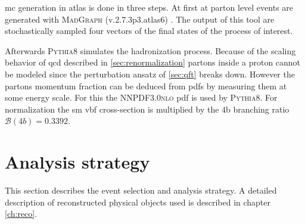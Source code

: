 \ac{mc} generation in \ac{atlas} is done in three steps. At first at parton level events are generated with \textsc{MadGraph} (v.2.7.3p3.atlas6) \citep{alwall2014automated}. The output of this tool are stochastically sampled four vectors of the final states of the process of interest.

Afterwards \textsc{Pythia8} \citep{Sjostrand:2014zea} simulates the hadronization process. Because of the scaling behavior of \ac{qcd} described in \ref{sec:renormalization} partons inside a proton cannot be modeled since the perturbation ansatz of \ref{sec:qft} breaks down. However the partons momentum fraction can be deduced from \acp{pdf} by measuring them at some energy scale. For this the \textsc{NNPDF3.0nlo} \ac{pdf} is used by \textsc{Pythia8}. For normalization the \ac{sm} \ac{vbf} cross-section is multiplied by the 4b branching ratio $\mathcal{B}(4b)=0.3392$.



\section{Analysis strategy}
This section describes the event selection and analysis strategy. A detailed description of reconstructed physical objects used is described in chapter \ref{ch:reco}.

